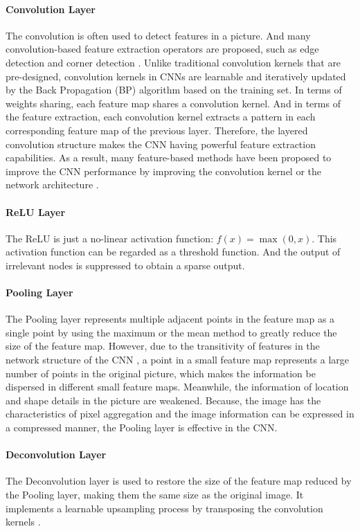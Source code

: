 \paragraph*{Convolution Layer}
The convolution is often used to detect features in a picture. And many convolution-based feature extraction operators are proposed, such as edge detection \cite{Convolution:edge:canny1987computational} and corner detection \cite{Convolution:corner:harris1988combined}. Unlike traditional convolution kernels that are pre-designed, convolution kernels in CNNs are learnable and iteratively updated by the Back Propagation (BP) algorithm based on the training set. In terms of weights sharing, each feature map shares a convolution kernel. And in terms of the feature extraction, each convolution kernel extracts a pattern in each corresponding feature map of the previous layer. Therefore, the layered convolution structure makes the CNN having powerful feature extraction capabilities. As a result, many feature-based methods have been proposed to improve the CNN performance by improving the convolution kernel \cite{CNN:kernel:zhou2017oriented} or the network architecture \cite{CNN:arch:he2016deep}.

\paragraph*{ReLU Layer}
The ReLU is just a no-linear activation function: $f(x) = \max(0,x)$. This activation function can be regarded as a threshold function. And the output of irrelevant nodes is suppressed to obtain a sparse output.
\paragraph*{Pooling Layer}
The Pooling layer represents multiple adjacent points in the feature map as a single point by using the maximum or the mean method to greatly reduce the size of the feature map. However, due to the transitivity of features in the network structure of the CNN \cite{CNN:pooling:zhou2016learning}, a point in a small feature map represents a large number of points in the original picture, which makes the information be dispersed in different small feature maps. Meanwhile, the information of location and shape details in the picture are weakened. Because, the image has the characteristics of pixel aggregation and the image information can be expressed in a compressed manner, the Pooling layer is effective in the CNN.
\paragraph*{Deconvolution Layer}
The Deconvolution layer is used to restore the size of the feature map reduced by the Pooling layer, making them the same size as the original image. It implements a learnable upsampling process by transposing the convolution kernels \cite{CNN:deconvolution:zeiler2011adaptive}.
